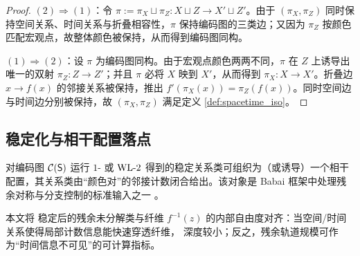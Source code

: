 \begin{proof}
$(2)\Rightarrow(1)$：令 $\pi:=\pi_X\sqcup\pi_Z: X\sqcup Z\to X'\sqcup Z'$。由于 $(\pi_X,\pi_Z)$ 同时保持空间关系、时间关系与折叠相容性，$\pi$ 保持编码图的三类边；又因为 $\pi_Z$ 按颜色匹配宏观点，故整体颜色被保持，从而得到编码图同构。

$(1)\Rightarrow(2)$：设 $\pi$ 为编码图同构。由于宏观点颜色两两不同，$\pi$ 在 $Z$ 上诱导出唯一的双射 $\pi_Z:Z\to Z'$；并且 $\pi$ 必将 $X$ 映到 $X'$，从而得到 $\pi_X:X\to X'$。折叠边 $x\to f(x)$ 的邻接关系被保持，推出 $f'(\pi_X(x))=\pi_Z(f(x))$。同时空间边与时间边分别被保持，故 $(\pi_X,\pi_Z)$ 满足定义 \ref{def:spacetime_iso}。
\end{proof}

\subsection{\WL{} 稳定化与相干配置落点}

\begin{proposition}\label{prop:wl_to_cc}
对编码图 $\mathcal{C}(\mathsf S)$ 运行 $1$-\WL{} 或 $\mathrm{WL}\text{-}2$ 得到的稳定关系类可组织为（或诱导）一个相干配置，其关系类由“颜色对”的邻接计数闭合给出。该对象是 Babai 框架中处理残余对称与分支控制的标准输入之一 \cite{babai2016gi,ivanov2013coherent,wl2018symmetryvsregularity}。
\end{proposition}

\begin{remark}
本文将 \WL{} 稳定后的残余未分解类与纤维 $f^{-1}(z)$ 的内部自由度对齐：当空间/时间关系使得局部计数信息能快速穿透纤维，\WL{} 深度较小；反之，残余轨道规模可作为“时间信息不可见”的可计算指标。
\end{remark}

